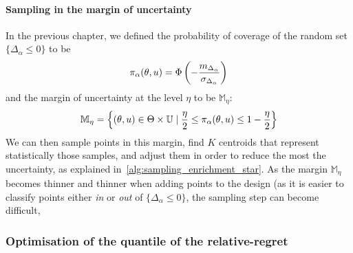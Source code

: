 \documentclass[../../Main_ManuscritThese.tex]{subfiles}
\begin{document}
\paragraph{Sampling in the margin of uncertainty}
In the previous chapter, we defined the probability of coverage of the
random set $\{\Delta_\alpha \leq 0\}$ to be
\begin{equation}
  \pi_{\alpha}(\theta, u) = \Phi\left(-\frac{m_{\Delta_{\alpha}}}{\sigma_{\Delta_\alpha}}\right)
  \end{equation}
  and the margin of uncertainty at the level $\eta$ to be $\mathbb{M}_{\eta}$:
  \begin{equation}
    \mathbb{M}_{\eta} = \left\{(\theta, u)\in \Theta \times \mathbb{U} \mid \frac{\eta}{2} \leq \pi_{\alpha}(\theta, u) \leq 1-\frac{\eta}{2}\right\}
  \end{equation}
  We can then sample points in this margin, find $K$ centroids that
  represent statistically those samples, and adjust them in order to
  reduce the most the uncertainty, as explained
  in~\cref{alg:sampling_enrichment_star}.  As the margin
  $\mathbb{M}_{\eta}$ becomes thinner and thinner when adding points
  to the design (as it is easier to classify points either \emph{in}
  or \emph{out} of $\{\Delta_{\alpha} \leq 0\}$, the sampling step
  can become difficult,  
\subsubsection{Optimisation of the quantile of the relative-regret}
\end{document}
